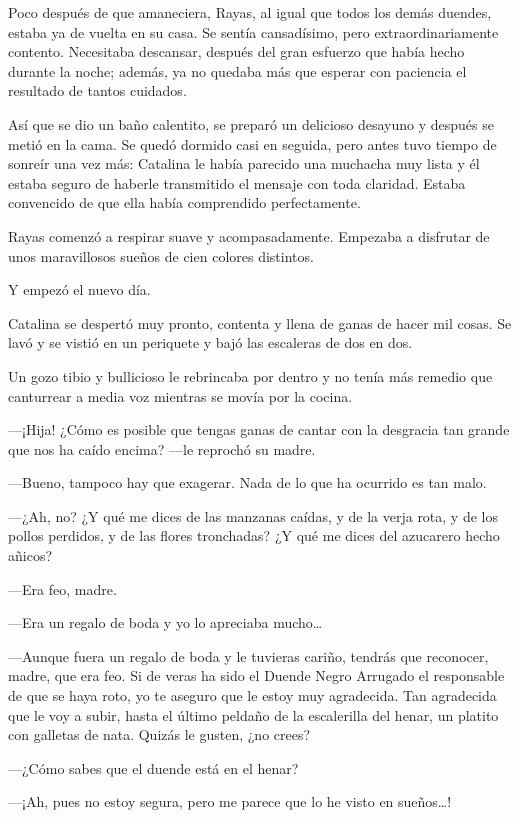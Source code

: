 \documentclass{barcodevapor3pags}
\begin{document}
Poco después de que amaneciera, Rayas, al igual que todos los demás
duendes, estaba ya de vuelta en su casa. Se sentía cansadísimo, pero
extraordinariamente contento. Necesitaba descansar, después del gran
esfuerzo que había hecho durante la noche; además, ya no quedaba más que
esperar con paciencia el resultado de tantos cuidados.

Así que se dio un baño calentito, se preparó un delicioso desayuno y
después se metió en la cama. Se quedó dormido casi en seguida, pero
antes tuvo tiempo de sonreír una vez más: Catalina le había parecido una
muchacha muy lista y él estaba seguro de haberle transmitido el mensaje
con toda claridad. Estaba convencido de que ella había comprendido
perfectamente.

Rayas comenzó a respirar suave y acompasadamente. Empezaba a disfrutar
de unos maravillosos sueños de cien colores distintos.

Y empezó el nuevo día.

Catalina se despertó muy pronto, contenta y llena de ganas de hacer mil
cosas. Se lavó y se vistió en un periquete y bajó las escaleras de dos
en dos.

Un gozo tibio y bullicioso le rebrincaba por dentro y no tenía más
remedio que canturrear a media voz mientras se movía por la cocina.

---¡Hija! ¿Cómo es posible que tengas ganas de cantar con la desgracia
tan grande que nos ha caído encima? ---le reprochó su madre.

---Bueno, tampoco hay que exagerar. Nada de lo que ha ocurrido es tan
malo.

---¿Ah, no? ¿Y qué me dices de las manzanas caídas, y de la verja rota,
y de los pollos perdidos, y de las flores tronchadas? ¿Y qué me dices
del azucarero hecho añicos?

---Era feo, madre.

---Era un regalo de boda y yo lo apreciaba mucho\ldots{}

---Aunque fuera un regalo de boda y le tuvieras cariño, tendrás que
reconocer, madre, que era feo. Si de veras ha sido el Duende Negro
Arrugado el responsable de que se haya roto, yo te aseguro que le estoy
muy agradecida. Tan agradecida que le voy a subir, hasta el último
peldaño de la escalerilla del henar, un platito con galletas de nata.
Quizás le gusten, ¿no crees?

---¿Cómo sabes que el duende está en el henar?

---¡Ah, pues no estoy segura, pero me parece que lo he visto en
sueños\ldots!
\end{document}
